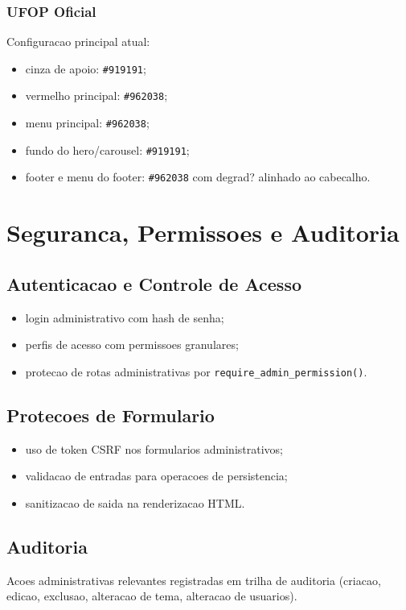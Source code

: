 \documentclass[12pt,a4paper]{article}
\begin{document}
\subsubsection{UFOP Oficial}
Configuracao principal atual:
\begin{itemize}
\item cinza de apoio: \texttt{\#919191};
\item vermelho principal: \texttt{\#962038};
\item menu principal: \texttt{\#962038};
\item fundo do hero/carousel: \texttt{\#919191};
\item footer e menu do footer: \texttt{\#962038} com degrad? alinhado ao cabecalho.
\end{itemize}

\section{Seguranca, Permissoes e Auditoria}
\subsection{Autenticacao e Controle de Acesso}
\begin{itemize}
\item login administrativo com hash de senha;
\item perfis de acesso com permissoes granulares;
\item protecao de rotas administrativas por \texttt{require\_admin\_permission()}.
\end{itemize}

\subsection{Protecoes de Formulario}
\begin{itemize}
\item uso de token CSRF nos formularios administrativos;
\item validacao de entradas para operacoes de persistencia;
\item sanitizacao de saida na renderizacao HTML.
\end{itemize}

\subsection{Auditoria}
Acoes administrativas relevantes registradas em trilha de auditoria (criacao, edicao, exclusao, alteracao de tema, alteracao de usuarios).
\end{document}
